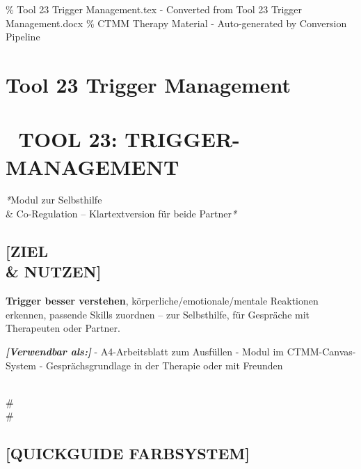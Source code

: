 \% Tool 23 Trigger Management.tex - Converted from Tool 23 Trigger Management.docx
\% CTMM Therapy Material - Auto-generated by Conversion Pipeline

\section{Tool 23 Trigger Management}
\label{sec:tool-23-trigger-management}

\section{📄 \textbf{TOOL 23: TRIGGER-MANAGEMENT}}

\textcolor{ctmmBlue}{} \textit{*}Modul zur Selbsthilfe \\& Co-Regulation -- Klartextversion für beide
Partner\textit{*}

\subsection{\textcolor{ctmmGreen}{} \textbf{[ZIEL \\& NUTZEN]}}

\textbf{\textcolor{ctmmRed}{Trigger} besser verstehen}, körperliche/emotionale/mentale Reaktionen
erkennen, passende Skills zuordnen -- zur Selbsthilfe, für Gespräche mit
Therapeuten oder Partner.

\textcolor{ctmmYellow}{} \textbf{\textit{[Verwendbar als:]}} - A4-Arbeitsblatt zum Ausfüllen -
Modul im \textcolor{ctmmBlue}{CTMM}-Canvas-System - Gesprächsgrundlage in der Therapie oder
mit Freunden

\\#\\#

\subsection{\textcolor{ctmmOrange}{} \textbf{[QUICKGUIDE FARBSYSTEM]}}

